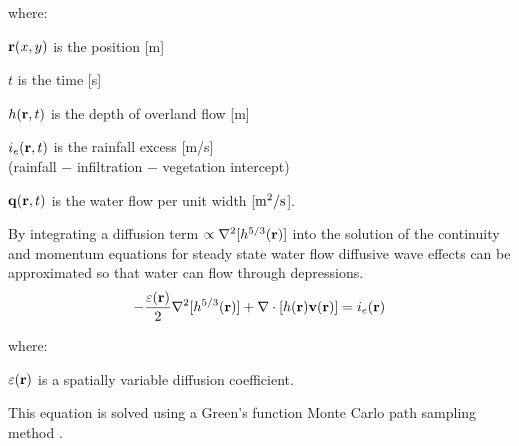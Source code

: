 \documentclass{isprs}
\begin{document}
where:

\hspace*{1em} ${\bf r}(x,y)$ is the position [m]

\hspace*{1em} $t$ is the time [s]

\hspace*{1em} $h({\bf r},t)$ is the depth of overland flow [m]

\hspace*{1em} $i_e({\bf r},t)$ is the rainfall excess [m/s]\\
\hspace*{1em} (rainfall $-$ infiltration $-$ vegetation intercept) 

\hspace*{1em} ${\bf q}({\bf r},t)$ is the water flow per unit width [$\rm m^2/s$].

By integrating a diffusion term $ \propto \nabla^2 [h^{5/3}({\bf r})]$ 
into
the solution of the continuity and momentum equations for steady state water flow
diffusive wave effects can be approximated
so that water can flow through depressions. 
%
\begin{equation}
\label{eq:difwater}
-{\varepsilon({\bf r})\over 2 }\nabla^2 [h^{5/3}({\bf r})]
+\nabla \cdot [ h({\bf r}){\bf v}({\bf r})] = i_e({\bf r})
\end{equation}

 where:
 
 \hspace*{1em} $\varepsilon({\bf r})$ is a spatially variable diffusion coefficient.

This equation is solved using a Green's function Monte Carlo path sampling method \cite{Mitasova2004}.
\end{document}
